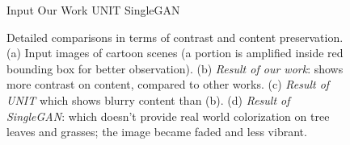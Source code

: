 \documentclass[runningheads]{llncs}
\begin{document}
\begin{figure}[!htb]
\subfigure
{Input}
\hspace{0.5in}
\subfigure
{Our Work}
\hspace{0.5in}
\subfigure
{UNIT}
\hspace{0.4in}
\subfigure
{SingleGAN}
\caption{Detailed comparisons in terms of contrast and content preservation. (a) Input images of cartoon scenes (a portion is amplified inside red bounding box for better observation). (b) \textit{Result of our work}: shows more contrast on content, compared to other works. (c) \textit{Result of UNIT}\cite{DBLP:journals/corr/LiuBK17} which shows blurry content than (b). (d) \textit{Result of SingleGAN}: which doesn't provide real world colorization on tree leaves and grasses; the image became faded and less vibrant.}
\label{fig:compare}
\end{figure}
\end{document}
